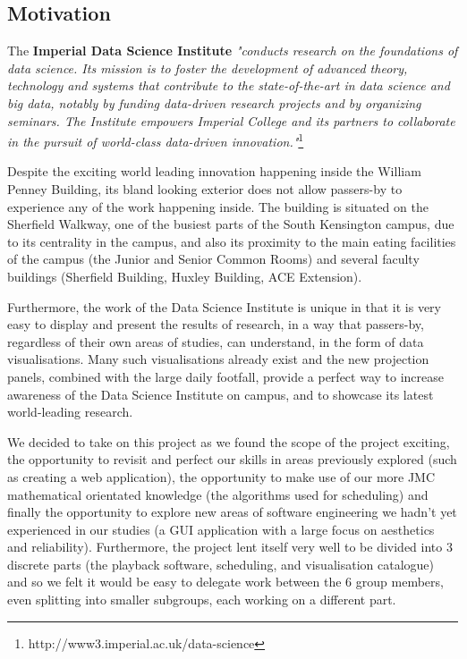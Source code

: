 \documentclass[a4paper, titlepage]{article}
\begin{document}
\subsection{Motivation}
The \textbf{Imperial Data Science Institute} \textit{"conducts research on the foundations of data science. Its mission is to foster the development of advanced theory, technology and systems that contribute to the state-of-the-art in data science and big data, notably by funding data-driven research projects and by organizing seminars. The Institute empowers Imperial College and its partners to collaborate in the pursuit of world-class data-driven innovation."}\footnote{http://www3.imperial.ac.uk/data-science}

Despite the exciting world leading innovation happening inside the William Penney Building, its bland looking exterior does not allow passers-by to experience any of the work happening inside. The building is situated on the Sherfield Walkway, one of the busiest parts of the South Kensington campus, due to its centrality in the campus, and also its proximity to the main eating facilities of the campus (the Junior and Senior Common Rooms) and several faculty buildings (Sherfield Building, Huxley Building, ACE Extension). 

Furthermore, the work of the Data Science Institute is unique in that it is very easy to display and present the results of research, in a way that passers-by, regardless of their own areas of studies, can understand, in the form of data visualisations. Many such visualisations already exist and the new projection panels, combined with the large daily footfall, provide a perfect way to increase awareness of the Data Science Institute on campus, and to showcase its latest world-leading research.

We decided to take on this project as we found the scope of the project exciting, the opportunity to revisit and perfect our skills in areas previously explored (such as creating a web application), the opportunity to make use of our more JMC mathematical orientated knowledge (the algorithms used for scheduling) and finally the opportunity to explore new areas of software engineering we hadn't yet experienced in our studies (a GUI application with a large focus on aesthetics and reliability). Furthermore, the project lent itself very well to be divided into 3 discrete parts (the playback software, scheduling, and visualisation catalogue) and so we felt it would be easy to delegate work between the 6 group members, even splitting into smaller subgroups, each working on a different part.
\end{document}
